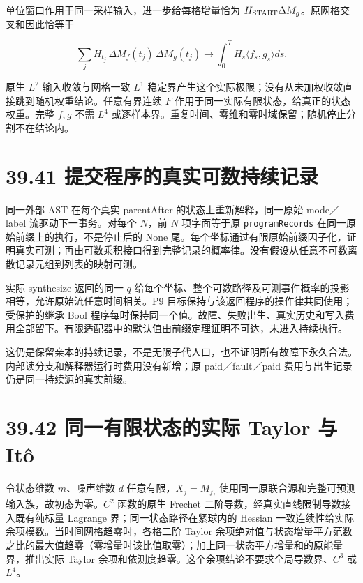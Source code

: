 \documentclass[
  11pt,
  oneside]{book}
\begin{document}
单位窗口作用于同一采样输入，进一步给每格增量恰为 \(H_{\rm START}\Delta M_g\)。原网格交叉和因此恰等于

\[\sum_j H_{t_j}\,\Delta M_f(t_j)\,\Delta M_g(t_j)
\longrightarrow\int_0^T H_s\langle f_s,g_s\rangle ds.\]

原生 \(L^2\) 输入收敛与网格一致 \(L^1\) 稳定界产生这个实际极限；没有从未加权收敛直接跳到随机权重结论。任意有界连续 \(F\) 作用于同一实际有限状态，给真正的状态权重。完整 \(f,g\) 不需 \(L^4\) 或逐样本界。重复时间、零维和零时域保留；随机停止分割不在结论内。

\section{39.41 提交程序的真实可数持续记录}\label{ux63d0ux4ea4ux7a0bux5e8fux7684ux771fux5b9eux53efux6570ux6301ux7eedux8bb0ux5f55}

同一外部 AST 在每个真实 parentAfter 的状态上重新解释，同一原始 mode／label 流驱动下一事务。对每个 \(N\)，前 \(N\) 项字面等于原 \nolinkurl{programRecords} 在同一原始前缀上的执行，不是停止后的 None 尾。每个坐标通过有限原始前缀因子化，证明真实可测；再由可数乘积接口得到完整记录的概率律。没有假设从任意不可数离散记录元组到列表的映射可测。

实际 synthesize 返回的同一 \(q\) 给每个坐标、整个可数路径及可测事件概率的投影相等，允许原始流任意时间相关。P9 目标保持与该返回程序的操作律共同使用；受保护的继承 Bool 程序每时保持同一个值。故障、失败出生、真实历史和写入费用全部留下。有限适配器中的默认值由前缀定理证明不可达，未进入持续执行。

这仍是保留亲本的持续记录，不是无限子代人口，也不证明所有故障下永久合法。内部读分支和解释器运行时费用没有新增；原 paid／fault／paid 费用与出生记录仍是同一持续源的真实前缀。

\section{39.42 同一有限状态的实际 Taylor 与 Itô}\label{ux540cux4e00ux6709ux9650ux72b6ux6001ux7684ux5b9eux9645-taylor-ux4e0e-ituxf4}

令状态维数 \(m\)、噪声维数 \(d\) 任意有限，\(X_j=M_{f_j}\) 使用同一原联合源和完整可预测输入族，故初态为零。\(C^2\) 函数的原生 Frechet 二阶导数，经真实直线限制导数接入既有纯标量 Lagrange 界；同一状态路径在紧球内的 Hessian 一致连续性给实际余项模数。当时间网格趋零时，各格二阶 Taylor 余项绝对值与状态增量平方范数之比的最大值趋零（零增量时该比值取零）；加上同一状态平方增量和的原能量界，推出实际 Taylor 余项和依测度趋零。这个余项结论不要求全局导数界、\(C^3\) 或 \(L^4\)。
\end{document}
